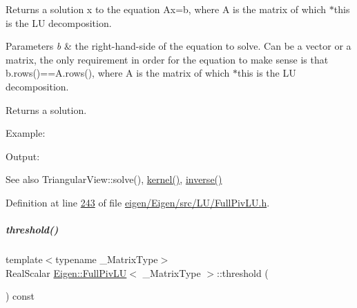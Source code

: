 \begin{DoxyReturn}{Returns}
a solution x to the equation Ax=b, where A is the matrix of which $\ast$this is the LU decomposition.
\end{DoxyReturn}

\begin{DoxyParams}{Parameters}
{\em b} & the right-\/hand-\/side of the equation to solve. Can be a vector or a matrix, the only requirement in order for the equation to make sense is that b.\+rows()==A.\+rows(), where A is the matrix of which $\ast$this is the LU decomposition.\\
\hline
\end{DoxyParams}
\begin{DoxyReturn}{Returns}
a solution.
\end{DoxyReturn}


Example\+: 
\begin{DoxyCodeInclude}
\end{DoxyCodeInclude}
 Output\+: 
\begin{DoxyVerbInclude}
\end{DoxyVerbInclude}


\begin{DoxySeeAlso}{See also}
Triangular\+View\+::solve(), \hyperlink{group___l_u___module_a70f52eeb2cd07dfbf790fce106fb4015}{kernel()}, \hyperlink{group___l_u___module_ae6f4bb55f859f6353f99cf15ecff4b25}{inverse()} 
\end{DoxySeeAlso}


Definition at line \hyperlink{eigen_2_eigen_2src_2_l_u_2_full_piv_l_u_8h_source_l00243}{243} of file \hyperlink{eigen_2_eigen_2src_2_l_u_2_full_piv_l_u_8h_source}{eigen/\+Eigen/src/\+L\+U/\+Full\+Piv\+L\+U.\+h}.

\mbox{\label{group___l_u___module_ad77539203694f2d85ff7d11616e5a0a5}} 
\subparagraph{\texorpdfstring{threshold()}{threshold()}\hspace{0.1cm}{\footnotesize\ttfamily [1/2]}}
{\footnotesize\ttfamily template$<$typename \+\_\+\+Matrix\+Type$>$ \\
Real\+Scalar \hyperlink{group___l_u___module_class_eigen_1_1_full_piv_l_u}{Eigen\+::\+Full\+Piv\+LU}$<$ \+\_\+\+Matrix\+Type $>$\+::threshold (\begin{DoxyParamCaption}{ }\end{DoxyParamCaption}) const\hspace{0.3cm}{\ttfamily [inline]}}

